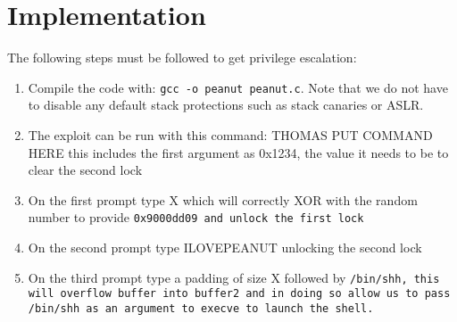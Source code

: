 \section{Implementation}
\label{sec:implementation}
The following steps must be followed to get privilege escalation:
\begin{enumerate}
\item Compile the code with:  {\tt gcc -o peanut peanut.c}. Note that we do not have to disable any default stack protections such as stack canaries or ASLR. 
\item The exploit can be run with this command: THOMAS PUT COMMAND HERE this includes the first argument as 0x1234, the value it needs to be to clear the second lock
\item On the first prompt type X which will correctly XOR with the random number to provide \tt{0x9000dd09} and unlock the first lock
\item On the second prompt type ILOVEPEANUT unlocking the second lock
\item On the third prompt type a padding of size X followed by \tt{/bin/shh}, this will overflow \tt{buffer} into \tt{buffer2} and in doing so allow us to pass \tt{/bin/shh} as an argument to execve to launch the shell.
\end{enumerate}


